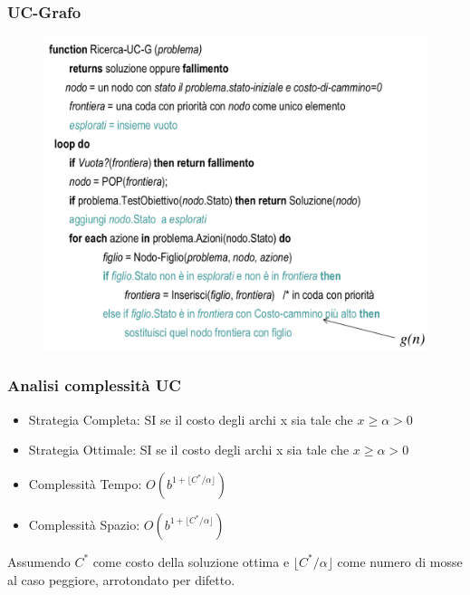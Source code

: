 \documentclass{article}
\begin{document}
\subsubsection{UC-Grafo}
\begin{figure}[H]
    \centering
    \includegraphics[scale=0.50]{Images/UC-G.png}
\end{figure}

\subsubsection{Analisi complessità UC}
\begin{itemize}
    \item Strategia Completa: SI se il costo degli archi x sia tale che $ x \geq \alpha > 0$
    \item Strategia Ottimale: SI se il costo degli archi x sia tale che $ x \geq \alpha > 0$
    \item Complessità Tempo: $O(b^{1+ \lfloor C^*/\alpha \rfloor})$
    \item Complessità Spazio: $O(b^{1+ \lfloor C^*/\alpha \rfloor})$
\end{itemize}
Assumendo $C^*$ come costo della soluzione ottima e $\lfloor C^*/\alpha \rfloor$ come numero di mosse al caso peggiore, arrotondato per difetto.
\end{document}

